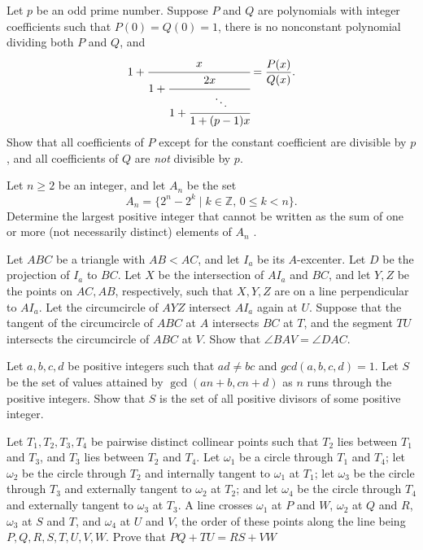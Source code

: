 \documentclass[11pt]{scrartcl}
\begin{document}
\begin{problem}[57065759079551]
Let $p$ be an odd prime number. Suppose $P$ and $Q$ are polynomials with integer coefficients such that $P(0)=Q(0)=1$, there is no nonconstant polynomial dividing both $P$ and $Q$, and
\[
  1 + \cfrac{x}{1 + \cfrac{2x}{1 + \cfrac{\ddots}{1 +
  (p-1)x}}}=\frac{P(x)}{Q(x)}.
\]Show that all coefficients of $P$ except for the constant coefficient are divisible by $p$, and all coefficients of $Q$ are \emph{not} divisible by $p$.
\end{problem}
\begin{problem}[888579900722065]
Let $n \ge 2$ be an integer, and let $A_n$ be the set\[A_n = \{2^n  - 2^k\mid k \in \mathbb{Z},\, 0 \le k < n\}.\]Determine the largest positive integer that cannot be written as the sum of one or more (not necessarily distinct) elements of $A_n$ .
\end{problem}
\begin{problem}[7017112574129036660]
	Let $ABC$ be a triangle with $AB<AC$, and let $I_a$ be its $A$-excenter. Let $D$ be the projection of $I_a$ to $BC$. Let $X$ be the intersection of $AI_a$ and $BC$, and let $Y,Z$ be the points on $AC,AB$, respectively, such that $X,Y,Z$ are on a line perpendicular to $AI_a$. Let the circumcircle of $AYZ$ intersect $AI_a$ again at $U$. Suppose that the tangent of the circumcircle of $ABC$ at $A$ intersects $BC$ at $T$, and the segment $TU$ intersects the circumcircle of $ABC$ at $V$. Show that $\angle BAV=\angle DAC$.
\end{problem}
\begin{problem}[4056351287962212080]
	Let $a,b,c,d$ be positive integers such that $ad \neq bc$ and $gcd(a,b,c,d)=1$. Let $S$ be the set of values attained by $\gcd(an+b,cn+d)$ as $n$ runs through the positive integers. Show that $S$ is the set of all positive divisors of some positive integer.
\end{problem}
\begin{problem}[8265057113266691052]
Let $T_1, T_2, T_3, T_4$ be pairwise distinct collinear points such that $T_2$ lies between $T_1$ and $T_3$, and $T_3$ lies between $T_2$ and $T_4$. Let $\omega_1$ be a circle through $T_1$ and $T_4$; let $\omega_2$ be the circle through $T_2$ and internally tangent to $\omega_1$ at $T_1$; let $\omega_3$ be the circle through $T_3$ and externally tangent to $\omega_2$ at $T_2$; and let $\omega_4$ be the circle through $T_4$ and externally tangent to $\omega_3$ at $T_3$. A line crosses $\omega_1$ at $P$ and $W$, $\omega_2$ at $Q$ and $R$, $\omega_3$ at $S$ and $T$, and $\omega_4$ at $U$ and $V$, the order of these points along the line being $P,Q,R,S,T,U,V,W$. Prove that $PQ + TU = RS + VW$
\end{problem}
\end{document}
